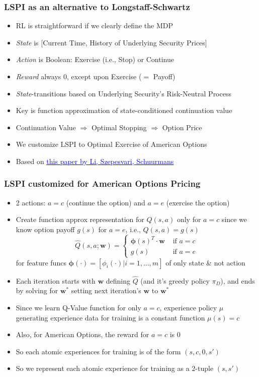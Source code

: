 \documentclass[handout]{beamer}
\begin{document}
\begin{frame}
\frametitle{LSPI as an alternative to Longstaff-Schwartz}
\pause
\begin{itemize}[<+->]
\item RL is straightforward if we clearly define the MDP
\item {\em State} is [Current Time, History of Underlying Security Prices]
\item {\em Action} is Boolean: Exercise (i.e., Stop) or Continue
\item {\em Reward} always 0, except upon Exercise ($=$ Payoff)
\item {\em State}-transitions based on Underlying Security's Risk-Neutral Process
\item Key is function approximation of state-conditioned continuation value
\item Continuation Value $\Rightarrow$ Optimal Stopping $\Rightarrow$ Option Price
\item We customize LSPI to Optimal Exercise of American Options
\item Based on \href{http://proceedings.mlr.press/v5/li09d/li09d.pdf}{\underline{\textcolor{blue}{this paper by Li, Szepesvari, Schuurmans}}}
\end{itemize}
\end{frame}

\begin{frame}
\frametitle{LSPI customized for American Options Pricing}
\pause
\begin{itemize}[<+->]
\item 2 actions: $a=c$ (continue the option) and $a=e$ (exercise the option)
\item Create function approx representation for $Q(s,a)$ only for $a=c$ since we know option payoff $g(s)$ for $a=e$, i.e., $Q(s,a) = g(s)$
$$
\hat{Q}(s,a; \bm{w}) =
\begin{cases}
\bm{\phi}(s)^T \cdot \bm{w} & \text{ if } a = c \\
g(s) & \text{ if } a = e
\end{cases}
$$
for feature funcs $\bm{\phi}(\cdot) = [\phi_i(\cdot)|i = 1, \ldots, m]$ of only state \& not action
\item Each iteration starts with $\bm{w}$ defining $\hat{Q}$ (and it's greedy policy $\pi_D$), and ends by solving for $\bm{w}^*$ setting next iteration's $\bm{w}$ to $\bm{w}^*$
\item Since we learn Q-Value function for only $a=c$, experience policy $\mu$ generating experience data for training is a constant function $\mu(s) = c$
\item Also, for American Options, the reward for $a=c$ is 0
\item So each atomic experiences for training is of the form $(s,c,0,s')$
\item So we represent each atomic experience for training as a 2-tuple $(s,s')$
\end{itemize}
\end{frame}
\end{document}
